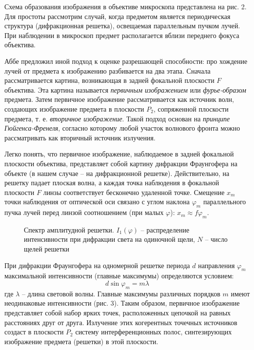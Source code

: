 \documentclass[14pt]{article}
\begin{document}
Схема образования изображения в объективе микроскопа представлена
на рис. 2. Для простоты рассмотрим случай, когда предметом является периодическая структура 
(дифракционная решетка), освещаемая параллельным пучком лучей. При наблюдении в микроскоп
предмет располагается вблизи переднего фокуса объектива.

Аббе предложил иной подход к оценке разрешающей способности: про
хождение лучей от предмета к изображению разбивается на два этапа.
Сначала рассматривается картина, возникающая в задней фокальной
плоскости $F$ объектива. Эта картина называется \textsl{первичным изображением}
или \textsl{фурье-образом} предмета. Затем первичное изображение
рассматривается как источник волн, создающих изображение предмета
в плоскости $P_2$, сопряженной плоскости предмета, т. е. \textsl{вторичное изображение}.
Такой подход основан на \textsl{принципе Гюйгенса-Френеля}, согласно
которому любой участок волнового фронта можно рассматривать
как вторичный источник излучения.

Легко понять, что первичное изображение, наблюдаемое в задней фокальной
плоскости объектива, представляет собой картину дифракции Фраунгофера на объекте (в нашем случае
-- на дифракционной решетке).
Действительно, на решетку падает плоская волна, а
каждая точка наблюдения в фокальной плоскости $F$ линзы соответствует бесконечно
удаленной точке. Смещение $x_m$ точки наблюдения от оптической оси
связано с углом наклона $\varphi_m$ параллельного пучка лучей перед линзой
соотношением (при малых $\varphi$): $x_m \approx f\varphi_m$.

\begin{figure}[h!]
	\caption{Спектр амплитудной решетки. $I_1(\varphi)$ -- распределение интенсивности при дифракции света на одиночной щели, $N$ -- число щелей решетки}
	\label{fig:image}
\end{figure}

При дифракции Фраунгофера на одномерной решетке периода
$d$ направления $\varphi_m$ максимальной интенсивности (главные максимумы) определяются
условием:
\begin{equation}
	d\sin\varphi_m = m\lambda
\end{equation}
\noindent где $\lambda$ -- длина световой волны. Главные максимумы различных порядков
$m$ имеют неодинаковые интенсивности (рис. 3). Таким образом,
первичное изображение представляет собой набор ярких точек, расположенных цепочкой на равных
расстояниях друг от друга. Излучение этих когерентных точечных источников создаст в плоскости
$P_2$ систему интерференционных полос, синтезирующих изображение предмета (решетки)
в этой плоскости.
\end{document}
